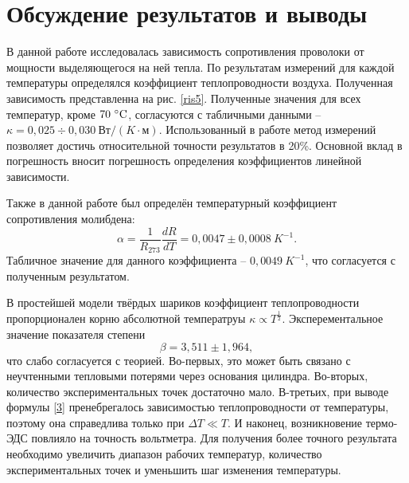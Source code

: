 \documentclass[a4paper, 12pt]{article}
\begin{document}
\section{Обсуждение результатов и выводы}

В данной работе исследовалась зависимость сопротивления проволоки от мощности выделяющегося на ней тепла. По результатам измерений для каждой температуры определялся коэффициент теплопроводности воздуха. Полученная зависимость представленна на рис. \ref{ris5}. Полученные значения для всех температур, кроме $70~\celsius$, согласуются с табличными данными -- $\kappa = 0,025\div0,030~Вт/(K \cdot м)$.
Использованный в работе метод измерений позволяет достичь относительной точности результатов в 20\%. Основной вклад в погрешность вносит погрешность определения коэффициентов линейной зависимости.

Также в данной работе был определён температурный коэффициент сопротивления молибдена:
$$\boxed{\alpha = \frac{1}{R_{273}}\frac{dR}{dT} = 0,0047\pm0,0008~K^{-1}}.$$
Табличное значение для данного коэффициента -- $0,0049~K^{-1}$, что согласуется с полученным результатом.

В простейшей модели твёрдых шариков коэффициент теплопроводности пропорционален корню абсолютной температруы $\kappa \varpropto T^{\frac{1}{2}}$. Эксперементальное значение показателя степени $$\boxed{\beta = 3,511\pm1,964},$$ что слабо согласуется с теорией. Во-первых, это может быть связано с неучтенными тепловыми потерями через основания цилиндра. Во-вторых, количество экспериментальных точек достаточно мало. В-третьих, при выводе формулы \eqref{3} пренебрегалось зависимостью теплопроводности от температуры, поэтому она справедлива только при $\Delta T \ll T$. И наконец, возникновение термо-ЭДС повлияло на точность вольтметра. Для получения более точного результата необходимо увеличить диапазон рабочих температур, количество экспериментальных точек и уменьшить шаг изменения температуры.
\end{document}
